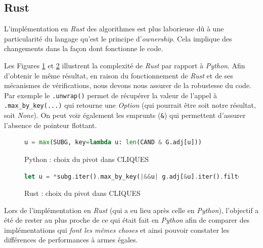 \documentclass[12pt,a4paper]{article}
\begin{document}
\subsection{Rust}%
\label{subsec:rust}

L'implémentation en \emph{Rust} des algorithmes est plus laborieuse dû à une particularité du langage qu'est le principe d'\emph{ownership}\cite{rust}. Cela implique des changements dans la façon dont fonctionne le code.

Les Figures \ref{fig:p1} et \ref{fig:r1} illustrent la complexité de \emph{Rust} par rapport à \emph{Python}. Afin d'obtenir le même résultat, en raison du fonctionnement de \emph{Rust} et de ses mécanismes de vérifications, nous devons nous assurer de la robustesse du code. Par exemple le \verb|.unwrap()| permet de récupérer la valeur de l'appel à \verb|.max_by_key(...)| qui retourne une \emph{Option} (qui pourrait être soit notre résultat, soit \emph{None}). On peut voir également les emprunts (\texttt{\&}) qui permettent d'assurer l'absence de pointeur flottant.

\begin{figure}[ht]
  \begin{lstlisting}[language=Python]
    u = max(SUBG, key=lambda u: len(CAND & G.adj[u]))
  \end{lstlisting}
  \caption{Python : choix du pivot dans CLIQUES}
  \label{fig:p1}
\end{figure}

\begin{figure}[ht]
  \begin{lstlisting}[language=Rust]
    let u = *subg.iter().max_by_key(|&&u| g.adj[&u].iter().filter(|&&neighbor| cand.contains(&neighbor)).count()).unwrap();
  \end{lstlisting}
  \caption{Rust : choix du pivot dans CLIQUES}
  \label{fig:r1}
\end{figure}

Lors de l'implémentation en \emph{Rust} (qui a eu lieu après celle en \emph{Python}), l'objectif a été de rester au plus proche de ce qui était fait en \emph{Python} afin de comparer des implémentations qui \og \textit{font les mêmes choses} \fg{} et ainsi pouvoir constater les différences de performances à armes égales.
\end{document}
